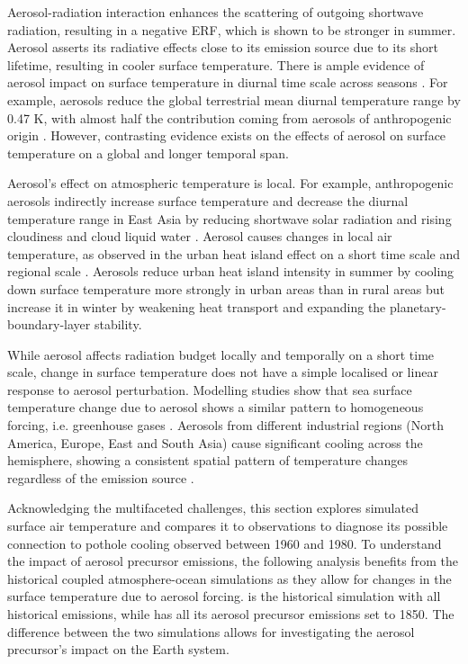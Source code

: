 Aerosol-radiation interaction enhances the scattering of outgoing shortwave radiation, resulting in a negative ERF, which is shown to be stronger in summer. Aerosol asserts its radiative effects close to its emission source due to its short lifetime, resulting in cooler surface temperature. There is ample evidence of aerosol impact on surface temperature in diurnal time scale across seasons \citep[e.g. ][]{hanMechanismsSeasonalDifferences2020}. For example, aerosols reduce the global terrestrial mean diurnal temperature range by 0.47 K, with almost half the contribution coming from aerosols of anthropogenic origin \citep{chakrabortyLandCoverRegulates2019}. However, contrasting evidence exists on the effects of aerosol on surface temperature on a global and longer temporal span. 

Aerosol's effect on atmospheric temperature is local. For example, anthropogenic aerosols indirectly increase surface temperature and decrease the diurnal temperature range in East Asia by reducing shortwave solar radiation and rising cloudiness and cloud liquid water \citep{huangImpactAerosolIndirect2006}. Aerosol causes changes in local air temperature, as observed in the urban heat island effect on a short time scale and regional scale \citep{hanMechanismsSeasonalDifferences2020}. Aerosols reduce urban heat island intensity in summer by cooling down surface temperature more strongly in urban areas than in rural areas but increase it in winter by weakening heat transport and expanding the planetary-boundary-layer stability. 

While aerosol affects radiation budget locally and temporally on a short time scale, change in surface temperature does not have a simple localised or linear response to aerosol perturbation. Modelling studies show that sea surface temperature change due to aerosol shows a similar pattern to homogeneous forcing, i.e. greenhouse gases \citep{xieSimilarSpatialPatterns2013,kasoarSimilarSpatialPatterns2018}. Aerosols from different industrial regions (North America, Europe, East and South Asia) cause significant cooling across the hemisphere, showing a consistent spatial pattern of temperature changes regardless of the emission source \citep{kasoarSimilarSpatialPatterns2018, lewinschalLocalRemoteTemperature2019}.  

Acknowledging the multifaceted challenges, this section explores simulated surface air temperature and compares it to observations to diagnose its possible connection to pothole cooling observed between 1960 and 1980. To understand the impact of aerosol precursor emissions, the following analysis benefits from the historical coupled atmosphere-ocean simulations as they allow for changes in the surface temperature due to aerosol forcing. \hist{} is the historical simulation with all historical emissions, while \histpiaer{} has all its aerosol precursor emissions set to 1850. The difference between the two simulations allows for investigating the aerosol precursor's impact on the Earth system.


